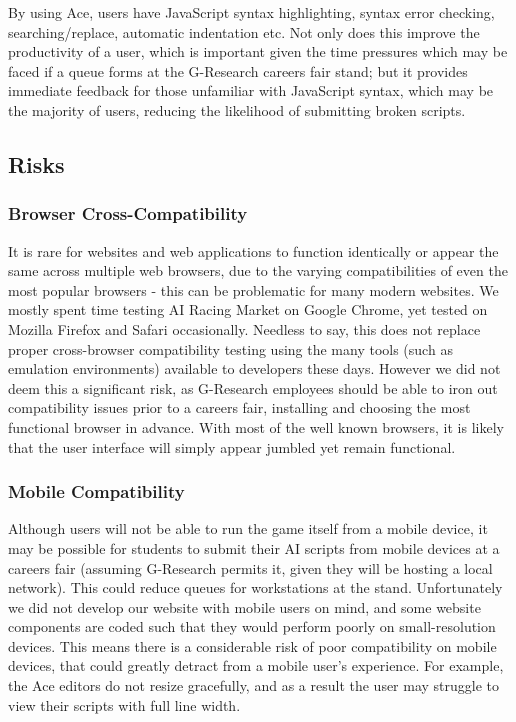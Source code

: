 \noindent By using Ace, users have JavaScript syntax highlighting, syntax error checking, searching/replace, automatic indentation etc. Not only does this improve the productivity of a user, which is important given the time pressures which may be faced if a queue forms at the G-Research careers fair stand; but it provides immediate feedback for those unfamiliar with JavaScript syntax, which may be the majority of users, reducing the likelihood of submitting broken scripts.

\subsection{Risks}

\subsubsection{Browser Cross-Compatibility}

It is rare for websites and web applications to function identically or appear the same across multiple web browsers, due to the varying compatibilities of even the most popular browsers - this can be problematic for many modern websites. We mostly spent time testing AI Racing Market on Google Chrome, yet tested on Mozilla Firefox and Safari occasionally. Needless to say, this does not replace proper cross-browser compatibility testing using the many tools (such as emulation environments) available to developers these days. However we did not deem this a significant risk, as G-Research employees should be able to iron out compatibility issues prior to a careers fair, installing and choosing the most functional browser in advance. With most of the well known browsers, it is likely that the user interface will simply appear jumbled yet remain functional.

\subsubsection{Mobile Compatibility}

Although users will not be able to run the game itself from a mobile device, it may be possible for students to submit their AI scripts from mobile devices at a careers fair (assuming G-Research permits it, given they will be hosting a local network). This could reduce queues for workstations at the stand. Unfortunately we did not develop our website with mobile users on mind, and some website components are coded such that they would perform poorly on small-resolution devices. This means there is a considerable risk of poor compatibility on mobile devices, that could greatly detract from a mobile user's experience. For example, the Ace editors do not resize gracefully, and as a result the user may struggle to view their scripts with full line width.

